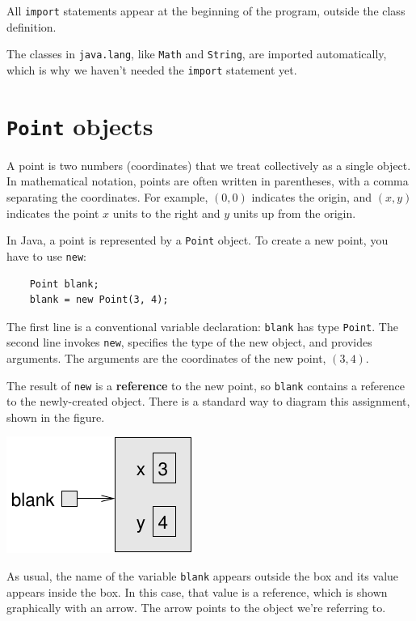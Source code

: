 \documentclass[12pt]{book}
\theoremstyle{exercise}
\begin{document}
All {\tt import} statements appear at the beginning of the program,
outside the class definition.

The classes in {\tt java.lang}, like {\tt Math} and {\tt String}, are
imported automatically, which is why we haven't needed the
{\tt import} statement yet.


\section{{\tt Point} objects}

A point is two numbers (coordinates)
that we treat collectively as a single object.  In mathematical
notation, points are often written in parentheses, with a comma
separating the coordinates.  For example, $(0, 0)$ indicates
the origin, and $(x, y)$ indicates the point $x$ units to the
right and $y$ units up from the origin.


In Java, a point is represented by a {\tt Point} object.  To
create a new point, you have to use {\tt new}:

\begin{lstlisting}
    Point blank;
    blank = new Point(3, 4);
\end{lstlisting}
%
The first line is a conventional variable declaration: {\tt blank}
has type {\tt Point}.  The second line invokes {\tt new}, specifies
the type of the new object, and provides arguments.  The arguments are
the coordinates of the new point, $(3, 4)$.


The result of {\tt new} is a {\bf reference} to the new
point, so {\tt blank} contains a reference to the
newly-created object.  There is a standard way to diagram this
assignment, shown in the figure.


\includegraphics{figs/reference.pdf}


As usual, the name of the variable {\tt blank} appears outside the box
and its value appears inside the box.  In this case, that value is a
reference, which is shown graphically with an arrow.  The
arrow points to the object we're referring to.
\end{document}
